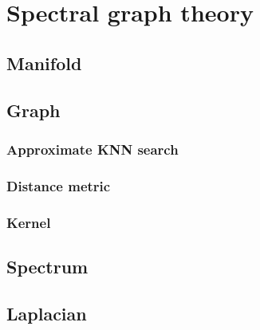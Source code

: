 \documentclass[a4paper,12pt,twoside]{report}
\begin{document}
\chapter{Spectral graph theory}

\section{Manifold}

\section{Graph}

\subsection{Approximate KNN search}

\subsection{Distance metric}

\subsection{Kernel}

\section{Spectrum}

\section{Laplacian}
\end{document}
